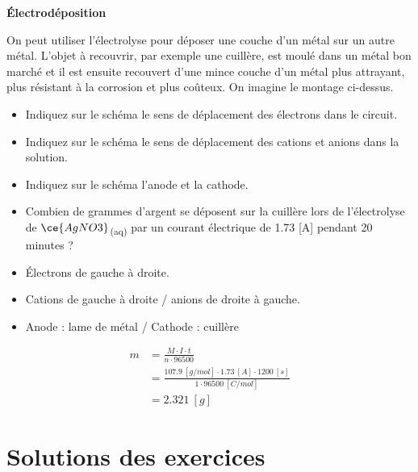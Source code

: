 \documentclass[
  11pt,
  a4paper,
  openany]{book}
\providecommand{\tightlist}{%
  \setlength{\itemsep}{0pt}\setlength{\parskip}{0pt}}
\begin{document}
\begin{Exercise}

\textbf{Électrodéposition}

On peut utiliser l'électrolyse pour déposer une couche d'un métal sur un autre métal. L'objet à recouvrir, par exemple une cuillère, est moulé dans un métal bon marché et il est ensuite recouvert d'une mince couche d'un métal plus attrayant, plus résistant à la corrosion et plus coûteux. On imagine le montage ci-dessus.

\begin{itemize}
\tightlist
\item
  Indiquez sur le schéma le sens de déplacement des électrons dans le circuit.
\item
  Indiquez sur le schéma le sens de déplacement des cations et anions dans la solution.
\item
  Indiquez sur le schéma l'anode et la cathode.
\item
  Combien de grammes d'argent se déposent sur la cuillère lors de l'électrolyse de \(\ce{AgNO3}\)\textsubscript{(aq)} par un courant électrique de 1.73 {[}A{]} pendant 20 minutes ?
\end{itemize}


\end{Exercise}

\begin{Answer}

\begin{itemize}
\tightlist
\item
  Électrons de gauche à droite.
\item
  Cations de gauche à droite / anions de droite à gauche.
\item
  Anode : lame de métal / Cathode : cuillère
\end{itemize}

\[
\begin{split}
  m &= \frac{M \cdot I \cdot t}{n \cdot 96500} \\
  &= \frac{107.9\ [g/mol] \cdot 1.73\ [A] \cdot 1200\ [s]}{1 \cdot 96500\ [C/mol]} \\
  &= 2.321\ [g]
\end{split}
\]

\end{Answer}

\clearpage

\section{Solutions des exercices} \shipoutAnswer
\end{document}
